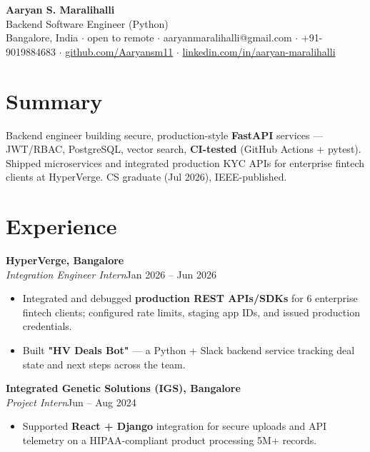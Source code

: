 \documentclass[10pt,a4paper]{article}
\begin{document}
\vspace*{-1cm}
\begin{center}
{\LARGE\bfseries Aaryan S. Maralihalli}\\[0.5em]
{\large Backend Software Engineer (Python)}\\[0.3em]
Bangalore, India $\cdot$ open to remote $\cdot$ aaryanmaralihalli@gmail.com $\cdot$ +91-9019884683 $\cdot$ \href{https://github.com/Aaryansm11}{github.com/Aaryansm11} $\cdot$ \href{https://linkedin.com/in/aaryan-maralihalli}{linkedin.com/in/aaryan-maralihalli}
\end{center}\vspace{0.4ex}
\section*{Summary}
Backend engineer building secure, production-style \textbf{FastAPI} services --- JWT/RBAC, PostgreSQL, vector search, \textbf{CI-tested} (GitHub Actions + pytest). Shipped microservices and integrated production KYC APIs for enterprise fintech clients at HyperVerge. CS graduate (Jul 2026), IEEE-published.\par\vspace{2pt}
\section*{Experience}
\vspace{1pt}\textbf{HyperVerge, Bangalore}\\
\textit{Integration Engineer Intern}\hfill Jan 2026 -- Jun 2026\par\vspace{1pt}
\begin{itemize}
\item Integrated and debugged \textbf{production REST APIs/SDKs} for 6 enterprise fintech clients; configured rate limits, staging app IDs, and issued production credentials.
\item Built \textbf{"HV Deals Bot"} --- a Python + Slack backend service tracking deal state and next steps across the team.
\end{itemize}
\vspace{1pt}\textbf{Integrated Genetic Solutions (IGS), Bangalore}\\
\textit{Project Intern}\hfill Jun -- Aug 2024\par\vspace{1pt}
\begin{itemize}
\item Supported \textbf{React + Django} integration for secure uploads and API telemetry on a HIPAA-compliant product processing 5M+ records.
\end{itemize}
\end{document}
